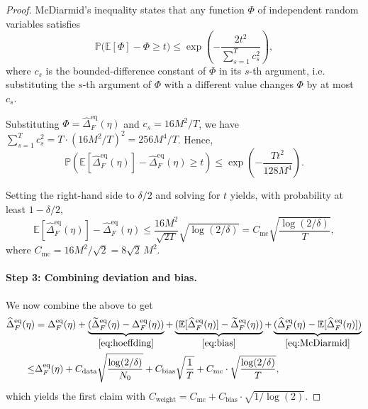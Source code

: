 \documentclass{article}
\begin{document}
\begin{proof}
    McDiarmid's inequality \citep{McDiarmid_1989,doobREGULARITYPROPERTIESCERTAIN} states that any function $\Phi$ of independent random variables satisfies
    \begin{equation}
    \mathbb{P}\big(\mathbb{E}[\Phi] - \Phi \ge t\big) \le \exp\!\left(-\frac{2 t^{2}}{\sum_{s=1}^{T} c_{s}^{2}}\right),
    \end{equation}
    where $c_{s}$ is the bounded-difference constant of $\Phi$ in its $s$-th argument, i.e. substituting the $s$-th argument of $\Phi$ with a different value changes $\Phi$ by at most $c_s$.
    
    Substituting $\Phi = \widehat{\Delta}^{\mathrm{eq}}_{F}(\eta)$ and $c_{s} = 16 M^{2}/T$, we have $\sum_{s=1}^{T} c_{s}^{2} = T \cdot (16 M^{2}/T)^{2} = 256 M^{4}/T$. Hence,
    \begin{equation}
        \mathbb{P}\!\left(\mathbb{E}[\widehat{\Delta}^{\mathrm{eq}}_{F}(\eta)] - \widehat{\Delta}^{\mathrm{eq}}_{F}(\eta) \ge t\right) \le \exp \left(-\frac{T t^{2}}{128 M^{4}}\right).
    \end{equation}
    
    Setting the right-hand side to $\delta/2$ and solving for $t$ yields, with probability at least $1-\delta/2$,
    \begin{equation} \label{eq:McDiarmid}
        \mathbb{E}[\widehat{\Delta}^{\mathrm{eq}}_{F}(\eta)] - \widehat{\Delta}^{\mathrm{eq}}_{F}(\eta) \le \frac{16 M^{2}}{\sqrt{2T}}\sqrt{\log(2/\delta)} = C_{\mathrm{mc}}\sqrt{\frac{\log(2/\delta)}{T}},
    \end{equation}
    where $C_{\mathrm{mc}} = 16 M^{2}/\sqrt{2} = 8\sqrt{2}\,M^{2}$.
    
    
    
    \paragraph{Step 3: Combining deviation and bias.} We now combine the above to get
    \begin{align}
        \widehat{\Delta}_F^{\mathrm{eq}}(\eta) &= \Delta^{\mathrm{eq}}_F(\eta) + \underbrace{(\widetilde{\Delta}_F^{\mathrm{eq}}(\eta) - \Delta^{\mathrm{eq}}_F(\eta))}_{\eqref{eq:hoeffding}} + \underbrace{(\mathbb{E}[\widehat{\Delta}_F^{\mathrm{eq}}(\eta)] - \widetilde{\Delta}_F^{\mathrm{eq}}(\eta))}_{\eqref{eq:bias}} + \underbrace{(\widehat{\Delta}_F^{\mathrm{eq}}(\eta) - \mathbb{E}[\widehat{\Delta}_F^{\mathrm{eq}}(\eta)] )}_{\eqref{eq:McDiarmid}} \\
        \leq &\Delta^{\mathrm{eq}}_F(\eta) +C_{\mathrm{data}}\sqrt{\frac{\log(2/\delta)}{N_0}}+C_{\mathrm{bias}}\sqrt{\frac{1}{T}}+C_{\mathrm{mc}}\cdot \sqrt{\frac{\log(2/\delta)}{T}},
    \end{align}
    which yields the first claim with $C_{\mathrm{weight}}= C_{\mathrm{mc}} + C_{\mathrm{bias}}\cdot\sqrt{1/\log(2)}$.


\end{proof}
\end{document}
